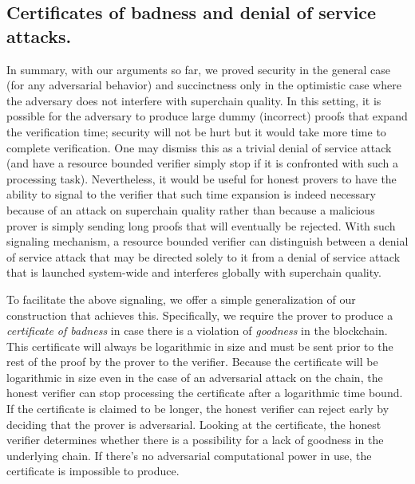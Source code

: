 \subsection{Certificates of badness and denial of service attacks.}
In summary, with our arguments so far,  we proved security in the general case (for any adversarial behavior)  and succinctness only in the optimistic case where the adversary does not interfere with superchain quality.
In this setting, it is possible for the
adversary to produce large dummy (incorrect) proofs that
expand the verification time; security will not be hurt but it would take more time to complete verification. One may dismiss this as a trivial denial of
service attack (and have a resource bounded
verifier simply stop  if it is confronted with such a processing task).
Nevertheless, it would be useful for honest provers
to have the ability to signal to the
verifier that such time expansion is indeed necessary because
of an attack on superchain quality rather than because
a malicious prover is simply sending long proofs that will eventually
be rejected. With such signaling mechanism, a resource bounded verifier can
distinguish between a denial of service attack that may be directed solely to it
from  a denial of service attack that is launched system-wide
and interferes globally with superchain quality.

 To facilitate the above signaling, we offer a simple generalization of our
construction that achieves this.
Specifically, we require the prover to produce a
\textit{certificate of badness} in case there is a violation of
\textit{goodness} in the blockchain. This certificate will always be logarithmic
in size and must be sent prior to the rest of the proof by the prover to the
verifier. Because the certificate will be logarithmic in size even in the case
of an adversarial attack on the chain, the honest verifier can stop processing
the certificate after a logarithmic time bound. If the certificate is claimed to
be longer, the honest verifier can reject early by deciding that the prover is
adversarial. Looking at the certificate, the honest verifier determines whether
there is a possibility for a lack of goodness in the underlying chain.
If there's no adversarial computational power in use, the certificate is impossible to produce.

